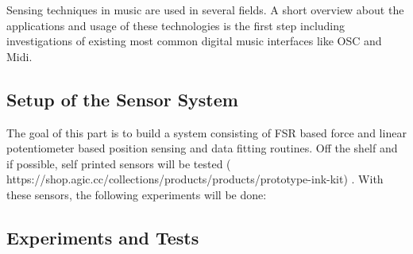 Sensing techniques in music are used in several fields. 
A short overview about the applications and usage of these technologies is the first step including investigations of existing most common digital music interfaces like OSC and Midi. 

\subsection* {Setup of the Sensor System}

The goal of this part is to build a system consisting of FSR based force and linear potentiometer based position sensing and data fitting routines. 
Off the shelf and if possible, self printed sensors will be tested ( https://shop.agic.cc/collections/products/products/prototype-ink-kit) . 
With these sensors, the following experiments will be done: 


\subsection* {Experiments and Tests}

